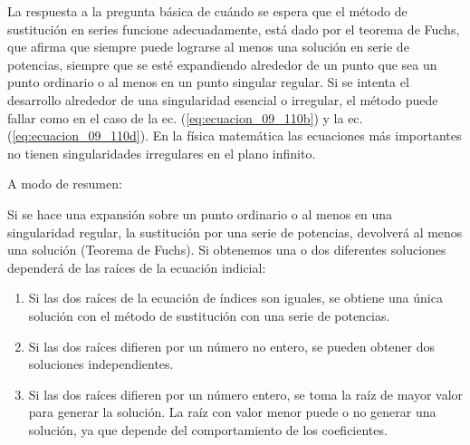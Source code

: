 La respuesta a la pregunta básica de cuándo se espera que el método de sustitución en series funcione adecuadamente, está dado por el teorema de Fuchs, que afirma que siempre puede lograrse al menos una solución en serie de potencias, siempre que se esté expandiendo alrededor de un punto que sea un punto ordinario o al menos en un punto singular regular. Si se intenta el desarrollo alrededor de  una singularidad esencial o irregular, el método puede fallar como en el caso de la ec. (\ref{eq:ecuacion_09_110b}) y la ec. (\ref{eq:ecuacion_09_110d}). En la física matemática las ecuaciones más importantes no tienen singularidades irregulares en el plano infinito.
\par
A modo de resumen:
\par
Si se hace una expansión sobre un punto ordinario o al menos en una singularidad regular, la sustitución por una serie de potencias, devolverá al menos una solución (Teorema de Fuchs). Si obtenemos una o dos diferentes soluciones dependerá de las raíces de la ecuación indicial:
\begin{enumerate}
\item Si las dos raíces de la ecuación de índices son iguales, se obtiene una única solución con el método de sustitución con una serie de potencias.
\item Si las dos raíces difieren por un número no entero, se pueden obtener dos soluciones independientes.
\item Si las dos raíces difieren por un número entero, se toma la raíz de mayor valor para generar la solución. La raíz con valor menor puede o no generar una solución, ya que depende del comportamiento de los coeficientes.
\end{enumerate}
